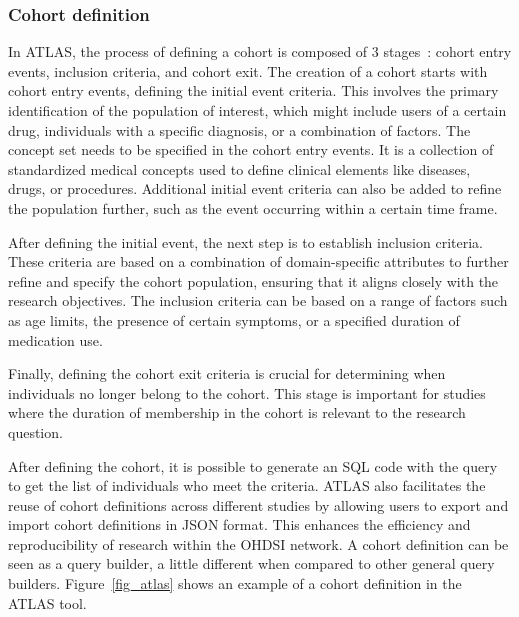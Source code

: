 \subsubsection{Cohort definition}

In ATLAS, the process of defining a cohort is composed of 3 stages~\cite{informatics_chapter_nodate}: cohort entry events, inclusion criteria, and cohort exit. The creation of a cohort starts with cohort entry events, defining the initial event criteria. This involves the primary identification of the population of interest, which might include users of a certain drug, individuals with a specific diagnosis, or a combination of factors. The concept set needs to be specified in the cohort entry events. It is a collection of standardized medical concepts used to define clinical elements like diseases, drugs, or procedures. Additional initial event criteria can also be added to refine the population further, such as the event occurring within a certain time frame.

After defining the initial event, the next step is to establish inclusion criteria. These criteria are based on a combination of domain-specific attributes to further refine and specify the cohort population, ensuring that it aligns closely with the research objectives. The inclusion criteria can be based on a range of factors such as age limits, the presence of certain symptoms, or a specified duration of medication use.

Finally, defining the cohort exit criteria is crucial for determining when individuals no longer belong to the cohort. This stage is important for studies where the duration of membership in the cohort is relevant to the research question.

After defining the cohort, it is possible to generate an SQL code with the query to get the list of individuals who meet the criteria. ATLAS also facilitates the reuse of cohort definitions across different studies by allowing users to export and import cohort definitions in JSON format. This enhances the efficiency and reproducibility of research within the OHDSI network. A cohort definition can be seen as a query builder, a little different when compared to other general query builders. Figure~\ref{fig_atlas} shows an example of a cohort definition in the ATLAS tool.



